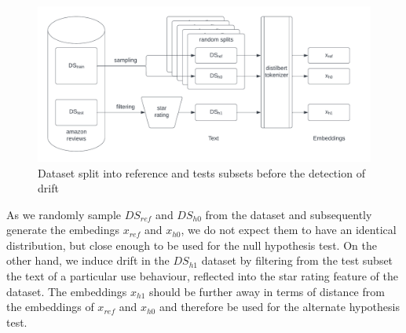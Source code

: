 \documentclass[12pt]{report}
\begin{document}
\begin{figure}[h]
    \centering
    \includegraphics[width=0.7\linewidth]{images/data_split}
    \caption{Dataset split into reference and tests subsets before the detection of drift}
    \label{fig:data_split}
\end{figure}

As we randomly sample \(DS_{ref}\) and \(DS_{h0}\) from the dataset and subsequently generate the embedings \(x_{ref}\) and \(x_{h0}\), we do not expect them to have an identical distribution, but close enough to be used for the null hypothesis test.
On the other hand, we induce drift in the \(DS_{h1}\) dataset by filtering from the test subset the text of a particular use behaviour, reflected into the star rating feature of the dataset.
The embeddings \(x_{h1}\) should be further away in terms of distance from the embeddings of \(x_{ref}\) and \(x_{h0}\) and therefore be used for the alternate hypothesis test.



\end{document}
